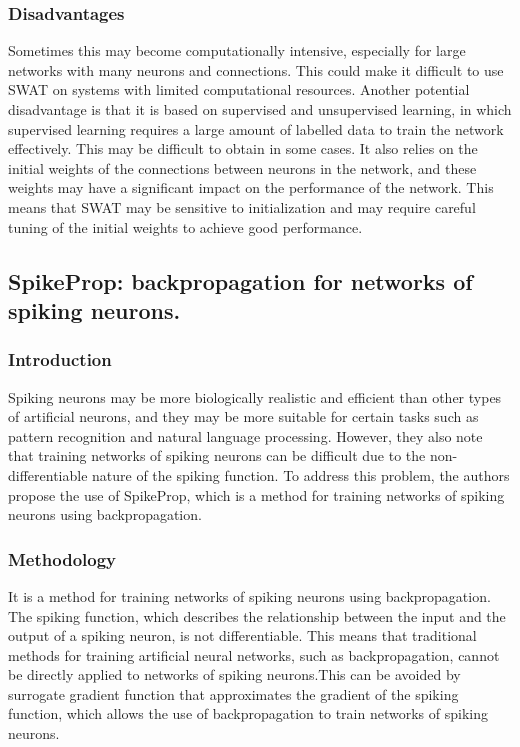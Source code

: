 \subsubsection{Disadvantages}
Sometimes this may become computationally intensive, especially for large
networks with many neurons and connections. This could make it difficult to use
SWAT on systems with limited computational resources. Another potential
disadvantage is that it is based on supervised and unsupervised learning, in
which supervised learning requires a large amount of labelled data to train the
network effectively. This may be difficult to obtain in some cases. It also
relies on the initial weights of the connections between neurons in the
network, and these weights may have a significant impact on the performance of
the network. This means that SWAT may be sensitive to initialization and may
require careful tuning of the initial weights to achieve good performance.
\subsection{SpikeProp: backpropagation for networks of spiking neurons.}
\subsubsection{Introduction}
Spiking neurons may be more biologically realistic and efficient than other
types of artificial neurons, and they may be more suitable for certain tasks
such as pattern recognition and natural language processing. However, they also
note that training networks of spiking neurons can be difficult due to the
non-differentiable nature of the spiking function. To address this problem, the
authors propose the use of SpikeProp\cite{spikeprop}, which is a method for
training networks of spiking neurons using backpropagation.
\subsubsection{Methodology}
It is a method for training networks of spiking neurons using backpropagation.
The spiking function, which describes the relationship between the input and
the output of a spiking neuron, is not differentiable. This means that
traditional methods for training artificial neural networks, such as
backpropagation, cannot be directly applied to networks of spiking neurons.This
can be avoided by surrogate gradient function that approximates the gradient of
the spiking function, which allows the use of backpropagation to train networks
of spiking neurons.

